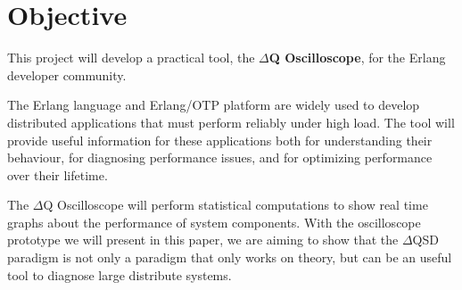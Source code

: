 \section{Objective}
     This project will develop a practical tool, the \textbf{$\Delta$Q Oscilloscope}, for the Erlang developer community. 
    
    The Erlang language and Erlang/OTP platform are widely used to develop distributed applications that must perform reliably under high load. The tool will provide useful information for these applications both for understanding their behaviour, for diagnosing performance issues, and for optimizing performance over their lifetime. 
    
    The $\Delta$Q Oscilloscope will perform statistical computations to show real time graphs about the performance of system components. With the oscilloscope prototype we will present in this paper, we are aiming to show that the $\Delta$QSD paradigm is not only a paradigm that only works on theory, but can be an useful tool to diagnose large distribute systems.     

